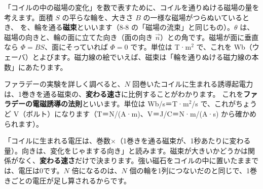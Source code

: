 
\label{ph:電-8:sec3}
「コイルの中の磁場の変化」を数で表すために、コイルを通りぬける磁場の量を考えます。面積 $S$ の平らな輪を、大きさ $B$ の一様な磁場がつらぬいているとき、
を、輪を通る\textbf{磁束}といいます（8-8 の「磁場の流束」と同じもの）。$\theta$ は、磁場の向きと、輪の面に立てた向き（面の向き $\vec n$）との角です。磁場が面に垂直なら $\Phi=BS$、面にそっていれば $\Phi=0$ です。単位は T·m$^2$ で、これを Wb（ウェーバ）とよびます。磁力線の絵でいえば、磁束は「輪を通りぬける磁力線の本数」にあたります。

ファラデーの実験を詳しく調べると、$N$ 回巻いたコイルに生まれる誘導起電力は、1巻きを通る磁束の、\textbf{変わる速さ}に比例することがわかります。
\label{ph:電-8:faraday}これを\textbf{ファラデーの電磁誘導の法則}といいます。単位は Wb/s＝T·m$^2$/s で、これがちょうど V（ボルト）になります（T＝N/(A·m)、V＝J/C＝N·m/(A·s) から確かめられます）。

\begin{phyomi}[$\mathcal E=-N\,\Delta\Phi/\Delta t$]
「コイルに生まれる電圧は、巻数×（1巻きを通る磁束が、1秒あたりに変わる量）。向きは、変化をじゃまする向き」と読みます。磁束が大きいかどうかは関係がなく、\textbf{変わる速さ}だけで決まります。強い磁石をコイルの中に置いたままでは、電圧は0です。$N$ 倍になるのは、$N$ 個の輪を1列につないだのと同じで、1巻きごとの電圧が足し算されるからです。
\end{phyomi}

